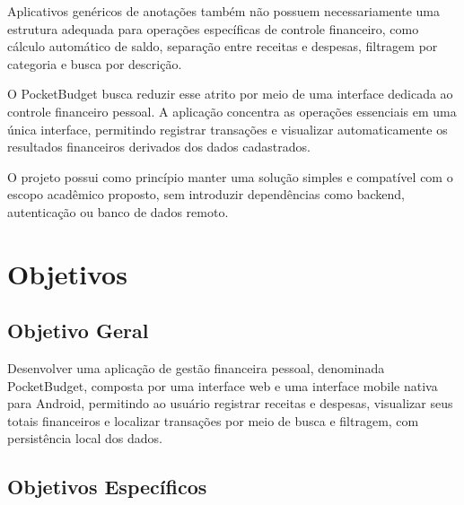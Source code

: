 \documentclass[12pt,a4paper]{article}
\begin{document}
Aplicativos genéricos de anotações também não possuem necessariamente uma estrutura adequada para operações específicas de controle financeiro, como cálculo automático de saldo, separação entre receitas e despesas, filtragem por categoria e busca por descrição.

O PocketBudget busca reduzir esse atrito por meio de uma interface dedicada ao controle financeiro pessoal. A aplicação concentra as operações essenciais em uma única interface, permitindo registrar transações e visualizar automaticamente os resultados financeiros derivados dos dados cadastrados.

O projeto possui como princípio manter uma solução simples e compatível com o escopo acadêmico proposto, sem introduzir dependências como backend, autenticação ou banco de dados remoto.

\section{Objetivos}

\subsection{Objetivo Geral}

Desenvolver uma aplicação de gestão financeira pessoal, denominada PocketBudget, composta por uma interface web e uma interface mobile nativa para Android, permitindo ao usuário registrar receitas e despesas, visualizar seus totais financeiros e localizar transações por meio de busca e filtragem, com persistência local dos dados.

\subsection{Objetivos Específicos}
\end{document}
